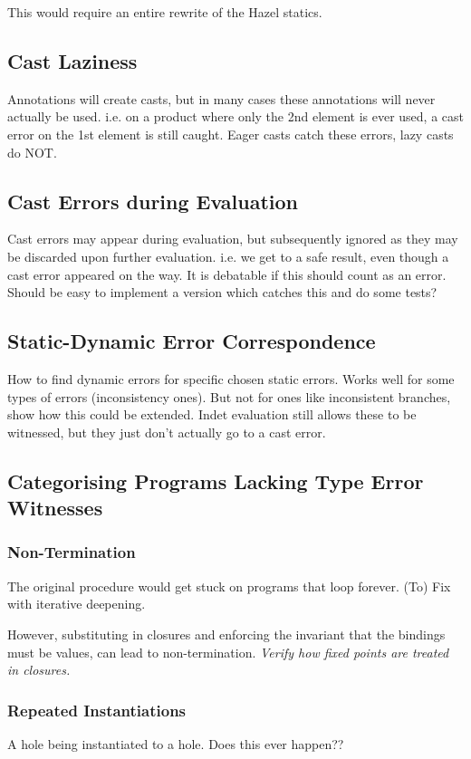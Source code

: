 This would require an entire rewrite of the Hazel statics.
\subsection{Cast Laziness}
Annotations will create casts, but in many cases these annotations will never actually be used. i.e. on a product where only the 2nd element is ever used, a cast error on the 1st element is still caught. Eager casts catch these errors, lazy casts do NOT.

\subsection{Cast Errors during Evaluation}
Cast errors may appear during evaluation, but subsequently ignored as they may be discarded upon further evaluation. i.e. we get to a safe result, even though a cast error appeared on the way. It is debatable if this should count as an error. Should be easy to implement a version which catches this and do some tests?
  
\subsection{Static-Dynamic Error Correspondence}
How to find dynamic errors for specific chosen static errors. Works well for some types of errors (inconsistency ones). But not for ones like inconsistent branches, show how this could be extended. Indet evaluation still allows these to be witnessed, but they just don't actually go to a cast error.
  
\subsection{Categorising Programs Lacking Type Error Witnesses}
\subsubsection{Non-Termination}
The original procedure would get stuck on programs that loop forever. (To) Fix with iterative deepening.

However, substituting in closures and enforcing the invariant that the bindings must be values, can lead to non-termination. \textit{Verify how fixed points are treated in closures.}
\subsubsection{Repeated Instantiations}
A hole being instantiated to a hole. Does this ever happen??
